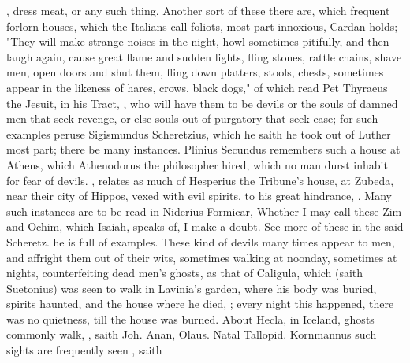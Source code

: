 , dress meat, or any such thing. Another
sort of these there are, which frequent forlorn houses,
which the Italians call foliots, most part innoxious,
Cardan holds; "They will make strange noises in the night,
howl sometimes pitifully, and then laugh again, cause great flame and sudden
lights, fling stones, rattle chains, shave men, open doors and shut them, fling
down platters, stools, chests, sometimes appear in the likeness of hares,
crows, black dogs," \etc{} of which read Pet Thyraeus the
Jesuit, in his Tract, , who will have them to be devils or the souls of damned men that seek
revenge, or else souls out of purgatory that seek ease; for such examples
peruse Sigismundus Scheretzius,  which he saith he took out of Luther most part;
there be many instances. Plinius Secundus remembers such a
house at Athens, which Athenodorus the philosopher hired, which no man durst
inhabit for fear of devils. \Austin{},  relates as much of Hesperius the Tribune's house, at Zubeda, near
their city of Hippos, vexed with evil spirits, to his great hindrance, . Many such instances are to be read
in Niderius Formicar,  \etc{}
Whether I may call these Zim and Ochim, which Isaiah,  speaks of, I make a doubt. See more of these in the said Scheretz.
 he is full of examples. These
kind of devils many times appear to men, and affright them out of their wits,
sometimes walking at noonday, sometimes at nights,
counterfeiting dead men's ghosts, as that of Caligula, which (saith Suetonius)
was seen to walk in Lavinia's garden, where his body was buried, spirits
haunted, and the house where he died, ; every night this happened, there
was no quietness, till the house was burned. About Hecla, in Iceland, ghosts
commonly walk, , saith Joh. Anan,
 Olaus.  Natal Tallopid. 
Kornmannus  such sights
are frequently seen , saith
